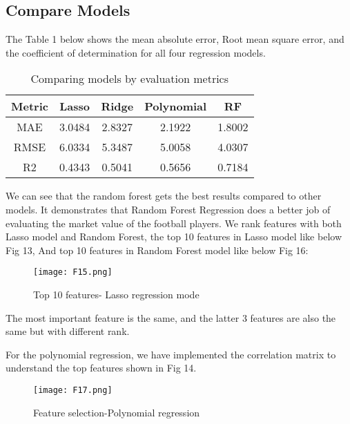 \documentclass[conference]{IEEEtran}
\begin{document}
\subsection{Compare Models}
The Table 1 below shows the mean absolute error, Root mean square error, and the coefficient of determination for all four regression models. \par
\begin{table}[h]
\large
\begin{center}
\begin{tabular}{|c|c|c|c|c|}
\hline \bf Metric & \bf Lasso & \bf Ridge & \bf Polynomial & \bf RF   \\ \hline
MAE & 3.0484 & 2.8327 & 2.1922 & 1.8002 \\
RMSE & 6.0334 & 5.3487 & 5.0058 & 4.0307 \\
R2 & 0.4343 & 0.5041 & 0.5656 & 0.7184 \\
\hline
\end{tabular}
\end{center}
\caption{\label{fontsizes} Comparing models by evaluation metrics}
\end{table}
We can see that the random forest gets the best results compared to other models. It demonstrates that Random Forest Regression does a better job of evaluating the market value of the football players.
We rank features with both Lasso model and Random Forest, the top 10 features in Lasso model like below Fig 13, And top 10 features in Random Forest model like below Fig 16: \par 
\begin{figure}[ht]
\begin{center}
\centerline{\texttt{[image: F15.png]}}
\caption{Top 10 features- Lasso regression mode}
\label{bayespic}
\end{center}
\end{figure}
The most important feature is the same, and the latter 3 features are also the same but with different rank. \par
For the polynomial regression, we have implemented the correlation matrix to understand the top features shown in Fig 14. 


\begin{figure}[ht]
\begin{center}
\centerline{\texttt{[image: F17.png]}}
\caption{Feature selection-Polynomial regression}
\label{bayespic}
\end{center}
\end{figure}
\end{document}
